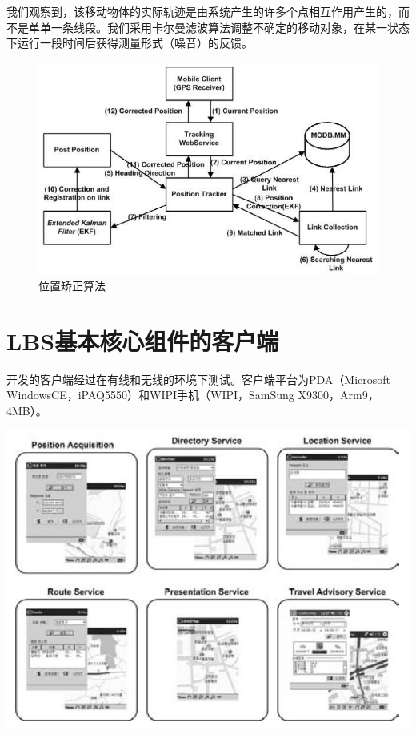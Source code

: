\documentclass{article}
\begin{document}
\begin{CJK}{UTF8}{gbsn}
	我们观察到，该移动物体的实际轨迹是由系统产生的许多个点相互作用产生的，而不是单单一条线段。我们采用卡尔曼滤波算法\cite{BrownPYC}调整不确定的移动对象，在某一状态下运行一段时间后获得测量形式（噪音）的反馈。

	\begin{figure}[htbp]
		\centering
		\includegraphics[bb=0 0 838 523, scale=0.45]{figure/fig11.png}
		\caption{位置矫正算法}
		\label{fig:position-correction-algorithm}
	\end{figure}


	\section{LBS基本核心组件的客户端}
	开发的客户端经过在有线和无线的环境下测试。客户端平台为PDA（Microsoft WindowsCE，iPAQ5550）和WIPI手机（WIPI，SamSung X9300，Arm9，4MB）。

	\noindent\begin{minipage}{\textwidth}
		\centering
		\includegraphics[bb=0 0 819 606, scale=0.45]{figure/fig12.png}
	\end{minipage}


\end{CJK}
\end{document}
